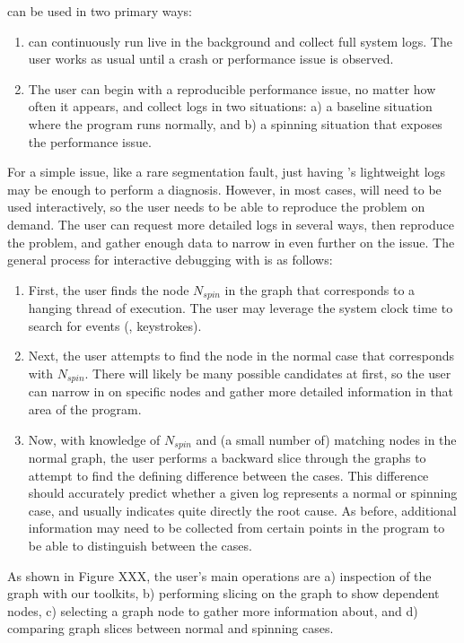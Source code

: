 \xxx can be used in two primary ways:
\begin{enumerate}
    \item \xxx can continuously run live in the background and collect full
    system logs. The user works as usual until a crash or performance issue is
    observed.

    \item The user can begin with a reproducible performance issue, no matter how often it appears, and collect
    logs in two situations: a) a baseline situation where the program runs
    normally, and b) a spinning situation that exposes the performance issue.

\end{enumerate}
For a simple issue, like a rare segmentation fault, just having \xxx's lightweight logs may be enough to perform a diagnosis.
However, in most cases, \xxx will need to be used interactively, so the user needs to be able to
reproduce the problem on demand.
The user can request more detailed logs in several ways, then reproduce the problem, and gather enough data to narrow in even further on the issue.
The general process for interactive debugging with \xxx is as follows:
\begin{enumerate}
    \item First, the user finds the node \emph{$N_{spin}$} in the \xxx graph
    that corresponds to a hanging thread of execution. The user may leverage
    the system clock time to search for events (\eg, keystrokes).

    \item Next, the user attempts to find the node in the normal case that
    corresponds with $N_{spin}$. There will likely be many possible candidates
    at first, so the user can narrow in on specific nodes and gather more
    detailed information in that area of the program.

    \item Now, with knowledge of $N_{spin}$ and (a small number of) matching
    nodes in the normal graph, the user performs a backward slice through the
    graphs to attempt to find the defining difference between the cases. This
    difference should accurately predict whether a given log represents a
    normal or spinning case, and usually indicates quite directly the root
    cause. As before, additional information may need to be collected from
    certain points in the program to be able to distinguish between the cases.

\end{enumerate}
As shown in Figure XXX, the user's main operations are a) inspection of
the graph with our toolkits, b) performing slicing on the graph to show dependent nodes, c)
selecting a graph node to gather more information about, and d) comparing graph
slices between normal and spinning cases.
